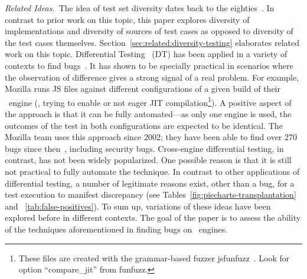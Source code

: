 \documentclass[smallextended]{svjour3}
\begin{document}
\emph{Related Ideas.}~The idea of test set diversity dates back to the
eighties~\cite{white-cohen-tse1980,ostrand-balcer-1988}. In contrast
to prior work on this topic, this paper explores diversity of
implementations and diversity of sources of test cases as opposed to
diversity of the test cases themselves. Section~\ref{sec:related:diversity-testing}
elaborates related work on this topic. Differential
Testing~\cite{Brumley-etal-ss07} (DT) has been applied in a variety of
contexts to find
bugs~\cite{Yang-etal-pldi11,Chen-etal-fse2015,Argyros-etla-ccs16,Chen-etal-pldi16,petsios-etal-sp2017,SivakornAPKJ17,Zhang:2017:ATD:3097368.3097448}.
It has shown to be specially practical in scenarios where the
observation of difference gives a strong signal of a real problem. For
example, Mozilla runs JS files against different configurations of a
given build of their \smonkey\ engine (\eg{}, trying to enable or not
eager JIT compilation\footnote{These files are created with the
  grammar-based fuzzer jsfunfuzz~\cite{jsfunfuzz}. Look for option
  ``compare\_jit'' from funfuzz.}). A positive aspect of the approach
is that it can be fully automated---as only one engine is used, the
outcomes of the test in both configurations are expected to be
identical. The Mozilla team uses this approach since 2002; they have
been able to find over 270 bugs since
then~\cite{jsfunfuzz-at-mozilla}, including security
bugs. Cross-engine differential testing, in contrast, has not been
widely popularized. One possible reason is that it is still not
practical to fully automate the technique. In contrast to other
applications of differential testing, a number of legitimate reasons
exist, other than a bug, for a test execution to manifest discrepancy
(see Tables~\ref{fig:piecharts-transplantation} and
~\ref{tab:false-positives}). To sum up, variations of these ideas have
been explored before in different contexts.  The goal of the paper is
to assess the ability of the techniques aforementioned in finding bugs
on \javascript\ engines.


\end{document}
